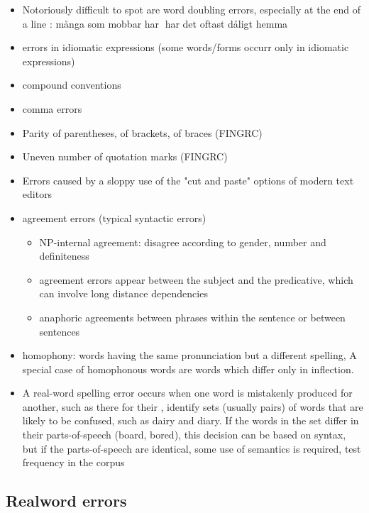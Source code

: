 \documentclass[a4paper,english,12pt]{article}
\begin{document}
\begin{spacing}{1.0}
\begin{itemize}
\item Notoriously difficult to spot are word doubling errors, especially at the end of a line \cite{Vosse1992}: många som mobbar har har det oftast dåligt hemma \cite[p.64]{Sofkova2003}
\item errors in idiomatic expressions (some words/forms occurr only in idiomatic expressions)
\item compound conventions
\item comma errors
\item Parity of parentheses, of brackets, of braces (FINGRC)
\item  Uneven number of quotation marks (FINGRC)
\item Errors caused by a sloppy use of the "cut and paste" options of modern text editors
\item agreement errors (typical syntactic errors) \cite{Vosse1992}
\begin{itemize}
\item NP-internal agreement: disagree according to gender, number and definiteness
\item agreement errors appear between the subject and the predicative, which can involve long distance dependencies
\item anaphoric agreements between phrases within the sentence or between sentences
\end{itemize}
\item homophony: words having the same pronunciation but a different spelling, A special case of homophonous words are words which differ only in inflection.
\item A real-word spelling error occurs when one word is mistakenly produced for another, such as there for their \cite{Pedler2005}, identify sets (usually pairs) of words that are likely to be confused, such as dairy and diary. If the words in the set differ in their parts-of-speech (board, bored), this decision can be based on syntax, but if the parts-of-speech are identical, some use of semantics is required, test frequency in the corpus
\end{itemize}

\subsection{Realword errors}


\end{spacing}
\end{document}
